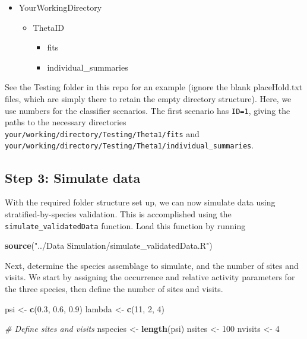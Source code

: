 \documentclass[
]{article}
\newenvironment{Shaded}{\begin{snugshade}}{\end{snugshade}}
\newcommand{\CommentTok}[1]{\textcolor[rgb]{0.56,0.35,0.01}{\textit{#1}}}
\newcommand{\DecValTok}[1]{\textcolor[rgb]{0.00,0.00,0.81}{#1}}
\newcommand{\FloatTok}[1]{\textcolor[rgb]{0.00,0.00,0.81}{#1}}
\newcommand{\FunctionTok}[1]{\textcolor[rgb]{0.13,0.29,0.53}{\textbf{#1}}}
\newcommand{\NormalTok}[1]{#1}
\newcommand{\OtherTok}[1]{\textcolor[rgb]{0.56,0.35,0.01}{#1}}
\newcommand{\StringTok}[1]{\textcolor[rgb]{0.31,0.60,0.02}{#1}}
\begin{document}
\begin{itemize}
 \item YourWorkingDirectory
 \begin{itemize}
    \item ThetaID
    \begin{itemize}
      \item fits
      \item individual\_summaries
    \end{itemize}
 \end{itemize}
\end{itemize}

See the Testing folder in this repo for an example (ignore the blank placeHold.txt files, which are simply there to retain the empty directory structure). Here, we use numbers for the classifier scenarios. The first scenario has \texttt{ID=1}, giving the paths to the necessary directories \texttt{your/working/directory/Testing/Theta1/fits} and \texttt{your/working/directory/Testing/Theta1/individual\_summaries}.

\hypertarget{dataSimulation}{%
\subsection{Step 3: Simulate data}\label{dataSimulation}}

With the required folder structure set up, we can now simulate data using stratified-by-species validation. This is accomplished using the \texttt{simulate\_validatedData} function. Load this function by running

\linespread{1}

\begin{Shaded}
\begin{Highlighting}[]
\FunctionTok{source}\NormalTok{(}\StringTok{"../Data Simulation/simulate\_validatedData.R"}\NormalTok{)}
\end{Highlighting}
\end{Shaded}

\linespread{1}

Next, determine the species assemblage to simulate, and the number of sites and visits. We start by assigning the occurrence and relative activity parameters for the three species, then define the number of sites and visits.

\linespread{1}

\begin{Shaded}
\begin{Highlighting}[]
\NormalTok{psi }\OtherTok{\textless{}{-}} \FunctionTok{c}\NormalTok{(}\FloatTok{0.3}\NormalTok{, }\FloatTok{0.6}\NormalTok{, }\FloatTok{0.9}\NormalTok{)}
\NormalTok{lambda }\OtherTok{\textless{}{-}} \FunctionTok{c}\NormalTok{(}\DecValTok{11}\NormalTok{, }\DecValTok{2}\NormalTok{, }\DecValTok{4}\NormalTok{)}

\CommentTok{\# Define sites and visits }
\NormalTok{nspecies }\OtherTok{\textless{}{-}} \FunctionTok{length}\NormalTok{(psi)}
\NormalTok{nsites }\OtherTok{\textless{}{-}} \DecValTok{100}
\NormalTok{nvisits }\OtherTok{\textless{}{-}} \DecValTok{4}
\end{Highlighting}
\end{Shaded}
\end{document}
